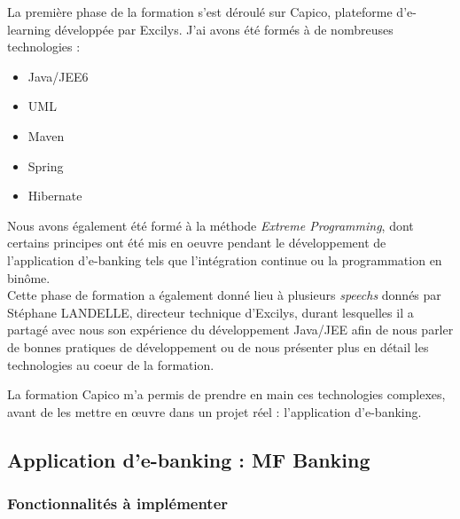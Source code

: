 La première phase de la formation s'est déroulé sur Capico, plateforme d'e-learning développée par Excilys.
J'ai  avons été formés à de nombreuses technologies :
\begin{itemize}
	\item Java/JEE6
	\item UML
	\item Maven
	\item Spring
	\item Hibernate
\end{itemize}

Nous avons également été formé à la méthode \textit{Extreme Programming}, dont certains principes ont été mis en oeuvre pendant le développement de l'application d'e-banking tels que l'intégration continue ou la programmation en binôme.\\

Cette phase de formation a également donné lieu à plusieurs \textit{speechs} donnés par Stéphane LANDELLE, directeur technique d'Excilys, durant lesquelles il a partagé avec nous son expérience du développement Java/JEE afin de nous parler de bonnes pratiques de développement ou de nous présenter plus en détail les technologies au coeur de la formation.

La formation Capico m'a permis de prendre en main ces technologies complexes, avant de les mettre en œuvre dans un projet réel : l'application d'e-banking.

\subsection{Application d'e-banking : MF Banking}

\subsubsection{Fonctionnalités à implémenter}

